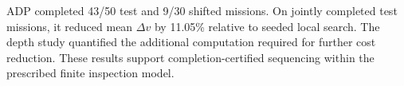 \documentclass{IEEEtaes}
\newcommand{\RTTestN}{50}
\newcommand{\RTTestSuccess}{43}
\newcommand{\RTOodN}{30}
\newcommand{\RTOodSuccess}{9}
\theoremstyle{remark}
\theoremstyle{plain}
\begin{document}
ADP completed \RTTestSuccess/\RTTestN{} test and \RTOodSuccess/\RTOodN{} shifted missions. On jointly completed test missions, it reduced mean $\Delta v$ by 11.05\% relative to seeded local search. The depth study quantified the additional computation required for further cost reduction. These results support completion-certified sequencing within the prescribed finite inspection model.






\end{document}
